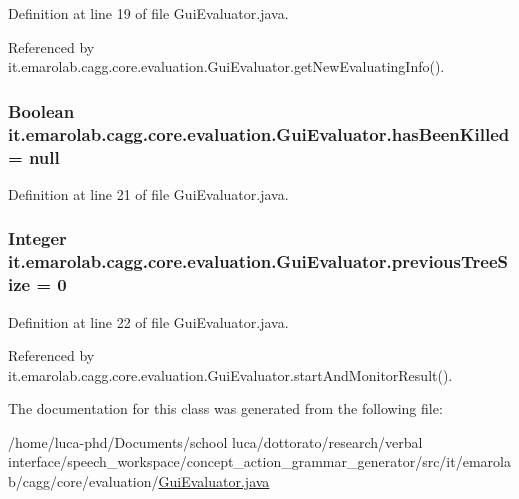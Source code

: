 Definition at line 19 of file Gui\-Evaluator.\-java.



Referenced by it.\-emarolab.\-cagg.\-core.\-evaluation.\-Gui\-Evaluator.\-get\-New\-Evaluating\-Info().

\hypertarget{classit_1_1emarolab_1_1cagg_1_1core_1_1evaluation_1_1GuiEvaluator_a5531f3ccea0d2388e677737c8afe44ad}{
\subsubsection[{has\-Been\-Killed}]{\setlength{\rightskip}{0pt plus 5cm}Boolean it.\-emarolab.\-cagg.\-core.\-evaluation.\-Gui\-Evaluator.\-has\-Been\-Killed = null\hspace{0.3cm}{\ttfamily [private]}}}\label{classit_1_1emarolab_1_1cagg_1_1core_1_1evaluation_1_1GuiEvaluator_a5531f3ccea0d2388e677737c8afe44ad}


Definition at line 21 of file Gui\-Evaluator.\-java.

\hypertarget{classit_1_1emarolab_1_1cagg_1_1core_1_1evaluation_1_1GuiEvaluator_a3fbd2b5da5785f922264c05fe0ae4770}{
\subsubsection[{previous\-Tree\-Size}]{\setlength{\rightskip}{0pt plus 5cm}Integer it.\-emarolab.\-cagg.\-core.\-evaluation.\-Gui\-Evaluator.\-previous\-Tree\-Size = 0\hspace{0.3cm}{\ttfamily [private]}}}\label{classit_1_1emarolab_1_1cagg_1_1core_1_1evaluation_1_1GuiEvaluator_a3fbd2b5da5785f922264c05fe0ae4770}


Definition at line 22 of file Gui\-Evaluator.\-java.



Referenced by it.\-emarolab.\-cagg.\-core.\-evaluation.\-Gui\-Evaluator.\-start\-And\-Monitor\-Result().



The documentation for this class was generated from the following file\-:\begin{DoxyCompactItemize}
\item 
/home/luca-\/phd/\-Documents/school luca/dottorato/research/verbal interface/speech\-\_\-workspace/concept\-\_\-action\-\_\-grammar\-\_\-generator/src/it/emarolab/cagg/core/evaluation/\hyperlink{GuiEvaluator_8java}{Gui\-Evaluator.\-java}\end{DoxyCompactItemize}
